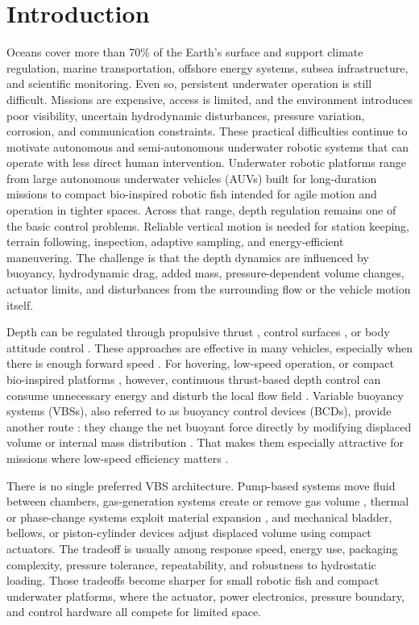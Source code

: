 ﻿\documentclass[subscriptcorrection,upint,varvw,barcolor=Goldenrod3,mathalfa=cal=euler,balance,hyphenate,french,pdf-a]{asmejour}
\begin{document}
\section{Introduction}
Oceans cover more than 70\% of the Earth's surface \cite{ocean_ngs,noaa_ocean_exploration} and support climate regulation, marine transportation, offshore energy systems, subsea infrastructure, and scientific monitoring. Even so, persistent underwater operation is still difficult. Missions are expensive, access is limited, and the environment introduces poor visibility, uncertain hydrodynamic disturbances, pressure variation, corrosion, and communication constraints. These practical difficulties continue to motivate autonomous and semi-autonomous underwater robotic systems that can operate with less direct human intervention.
Underwater robotic platforms range from large autonomous underwater vehicles (AUVs) built for long-duration missions to compact bio-inspired robotic fish \cite{masood2025visual} intended for agile motion and operation in tighter spaces. Across that range, depth regulation remains one of the basic control problems. Reliable vertical motion is needed for station keeping, terrain following, inspection, adaptive sampling, and energy-efficient maneuvering. The challenge is that the depth dynamics are influenced by buoyancy, hydrodynamic drag, added mass, pressure-dependent volume changes, actuator limits, and disturbances from the surrounding flow or the vehicle motion itself.

Depth can be regulated through propulsive thrust \cite{tanakitkorn2017depth}, control surfaces \cite{silvestre2007infante}, or body attitude control \cite{hong2010starfish}. These approaches are effective in many vehicles, especially when there is enough forward speed \cite{tanakitkorn2017depth}. For hovering, low-speed operation, or compact bio-inspired platforms \cite{katzschmann2018sofi}, however, continuous thrust-based depth control can consume unnecessary energy and disturb the local flow field \cite{zhao2016hovering}. Variable buoyancy systems (VBSs), also referred to as buoyancy control devices (BCDs), provide another route \cite{tangirala2007vbs}: they change the net buoyant force directly by modifying displaced volume or internal mass distribution \cite{tiwari2020vbs}. That makes them especially attractive for missions where low-speed efficiency matters \cite{carneiro2024depth}.

There is no single preferred VBS architecture. Pump-based systems move fluid between chambers, gas-generation systems create or remove gas volume \cite{koc2025bcd}, thermal or phase-change systems exploit material expansion \cite{hou2020electrothermal}, and mechanical bladder, bellows, or piston-cylinder devices adjust displaced volume using compact actuators. The tradeoff is usually among response speed, energy use, packaging complexity, pressure tolerance, repeatability, and robustness to hydrostatic loading. Those tradeoffs become sharper for small robotic fish and compact underwater platforms, where the actuator, power electronics, pressure boundary, and control hardware all compete for limited space.
\end{document}

